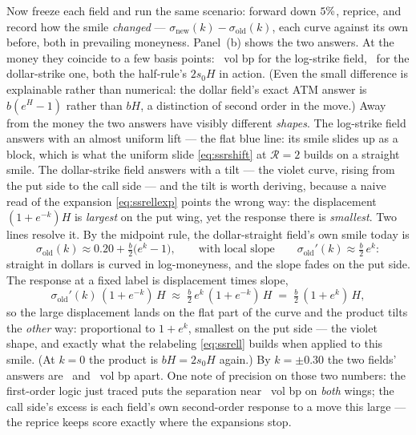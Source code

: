 Now freeze each field and run the same scenario: forward down
$5\%$, reprice, and record how the smile
\emph{changed} --- $\sigma_{\mathrm{new}}(k)-\sigma_{\mathrm{old}}(k)$,
each curve against its own before, both in prevailing moneyness.
Panel~(b) shows the two answers.  At the money they coincide to a few
basis points: \MacSsrRepAtmLogBp\ vol bp for the log-strike field,
\MacSsrRepAtmDlrBp\ for the dollar-strike one, both the half-rule's
$2s_0H$ in action.  (Even the small difference is explainable rather
than numerical: the dollar field's exact ATM answer is
$b(e^{H}-1)$ rather than $bH$, a distinction of second order in the
move.)  Away from the money the two answers have visibly different
\emph{shapes}.  The log-strike field answers with an almost uniform
lift --- the flat blue line: its smile slides up as a block, which is
what the uniform slide \eqref{eq:ssrshift} at $\mathcal{R}=2$ builds
on a straight smile.  The dollar-strike field answers with a
tilt --- the violet curve, rising from the put side to the call side
--- and the tilt is worth deriving, because a naive read of the
expansion \eqref{eq:ssrellexp} points the wrong way: the displacement
$(1+e^{-k})H$ is \emph{largest} on the put wing, yet the response
there is \emph{smallest}.  Two lines resolve it.  By the midpoint
rule, the dollar-straight field's own smile today is
\[
\sigma_{\mathrm{old}}(k)\approx 0.20+\tfrac{b}{2}\big(e^{k}-1\big),
\qquad\text{with local slope}\qquad
\sigma_{\mathrm{old}}'(k)\approx \tfrac{b}{2}\,e^{k} :
\]
straight in dollars is curved in log-moneyness, and the slope fades
on the put side.  The response at a fixed label is displacement times
slope,
\[
\sigma_{\mathrm{old}}'(k)\,(1+e^{-k})\,H
\;\approx\;\tfrac{b}{2}\,e^{k}\,(1+e^{-k})\,H
\;=\;\tfrac{b}{2}\,(1+e^{k})\,H ,
\]
so the large displacement lands on the flat part of the curve and
the product tilts the \emph{other} way: proportional to $1+e^{k}$,
smallest on the put side --- the violet shape, and exactly what the
relabeling \eqref{eq:ssrell} builds when applied to this smile.  (At
$k=0$ the product is $bH=2s_0H$ again.)  By $k=\pm0.30$ the two
fields' answers are \MacSsrRepSepPutBp\ and \MacSsrRepSepCallBp\ vol
bp apart.  One note of precision on those two numbers: the first-order
logic just traced puts the separation near \MacSsrRepSepPutBp\ vol bp
on \emph{both} wings; the call side's excess is each field's own
second-order response to a move this large --- the reprice keeps
score exactly where the expansions stop.

